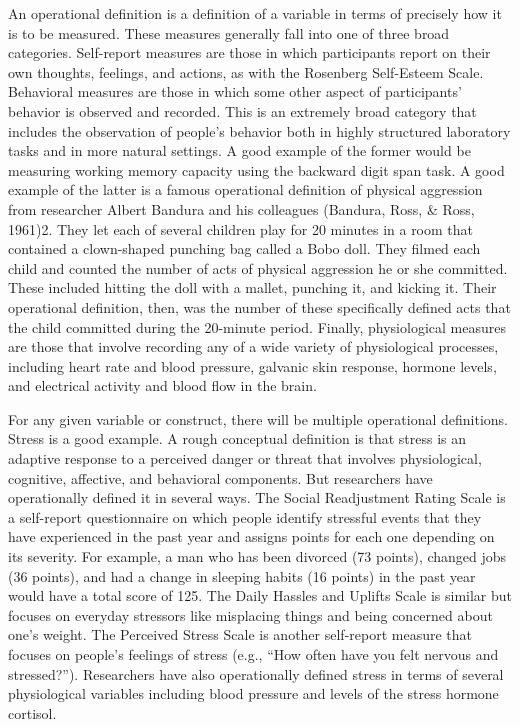 \documentclass[]{book}
\theoremstyle{definition}
\theoremstyle{definition}
\theoremstyle{remark}
\begin{document}
An operational definition is a definition of a variable in terms of
precisely how it is to be measured. These measures generally fall into
one of three broad categories. Self-report measures are those in which
participants report on their own thoughts, feelings, and actions, as
with the Rosenberg Self-Esteem Scale. Behavioral measures are those in
which some other aspect of participants' behavior is observed and
recorded. This is an extremely broad category that includes the
observation of people's behavior both in highly structured laboratory
tasks and in more natural settings. A good example of the former would
be measuring working memory capacity using the backward digit span task.
A good example of the latter is a famous operational definition of
physical aggression from researcher Albert Bandura and his colleagues
(Bandura, Ross, \& Ross, 1961)2. They let each of several children play
for 20 minutes in a room that contained a clown-shaped punching bag
called a Bobo doll. They filmed each child and counted the number of
acts of physical aggression he or she committed. These included hitting
the doll with a mallet, punching it, and kicking it. Their operational
definition, then, was the number of these specifically defined acts that
the child committed during the 20-minute period. Finally, physiological
measures are those that involve recording any of a wide variety of
physiological processes, including heart rate and blood pressure,
galvanic skin response, hormone levels, and electrical activity and
blood flow in the brain.

For any given variable or construct, there will be multiple operational
definitions. Stress is a good example. A rough conceptual definition is
that stress is an adaptive response to a perceived danger or threat that
involves physiological, cognitive, affective, and behavioral components.
But researchers have operationally defined it in several ways. The
Social Readjustment Rating Scale is a self-report questionnaire on which
people identify stressful events that they have experienced in the past
year and assigns points for each one depending on its severity. For
example, a man who has been divorced (73 points), changed jobs (36
points), and had a change in sleeping habits (16 points) in the past
year would have a total score of 125. The Daily Hassles and Uplifts
Scale is similar but focuses on everyday stressors like misplacing
things and being concerned about one's weight. The Perceived Stress
Scale is another self-report measure that focuses on people's feelings
of stress (e.g., ``How often have you felt nervous and stressed?'').
Researchers have also operationally defined stress in terms of several
physiological variables including blood pressure and levels of the
stress hormone cortisol.
\end{document}
